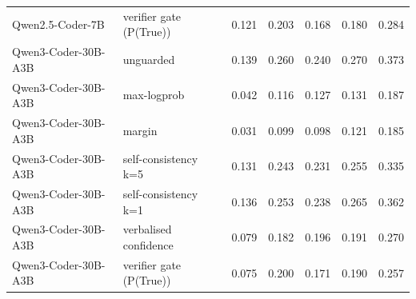 \begin{tabular}{llrrrrr}
Qwen2.5-Coder-7B & verifier gate (P(True)) & 0.121 & 0.203 & 0.168 & 0.180 & 0.284 \\
Qwen3-Coder-30B-A3B & unguarded & 0.139 & 0.260 & 0.240 & 0.270 & 0.373 \\
Qwen3-Coder-30B-A3B & max-logprob & 0.042 & 0.116 & 0.127 & 0.131 & 0.187 \\
Qwen3-Coder-30B-A3B & margin & 0.031 & 0.099 & 0.098 & 0.121 & 0.185 \\
Qwen3-Coder-30B-A3B & self-consistency k=5 & 0.131 & 0.243 & 0.231 & 0.255 & 0.335 \\
Qwen3-Coder-30B-A3B & self-consistency k=1 & 0.136 & 0.253 & 0.238 & 0.265 & 0.362 \\
Qwen3-Coder-30B-A3B & verbalised confidence & 0.079 & 0.182 & 0.196 & 0.191 & 0.270 \\
Qwen3-Coder-30B-A3B & verifier gate (P(True)) & 0.075 & 0.200 & 0.171 & 0.190 & 0.257 \\
\bottomrule
\end{tabular}

